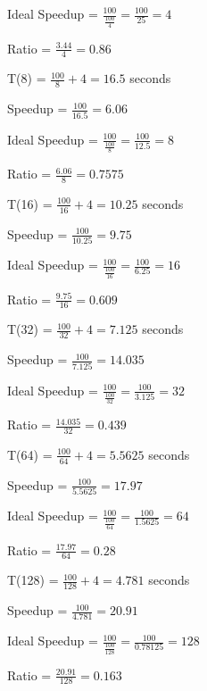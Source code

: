 \documentclass{article}
\begin{document}
    Ideal Speedup = $\frac{100}{\frac{100}{4}} = \frac{100}{25} = 4$

    Ratio = $\frac{3.44}{4} = 0.86$
    \vspace*{6pt}

    T(8) = $\frac{100}{8} + 4 = 16.5$ seconds

    Speedup = $\frac{100}{16.5} = 6.06$ 

    Ideal Speedup = $\frac{100}{\frac{100}{8}} = \frac{100}{12.5} = 8$

    Ratio = $\frac{6.06}{8} = 0.7575$
    \vspace*{6pt}

    T(16) = $\frac{100}{16} + 4 = 10.25$ seconds

    Speedup = $\frac{100}{10.25} = 9.75$ 

    Ideal Speedup = $\frac{100}{\frac{100}{16}} = \frac{100}{6.25} = 16$

    Ratio = $\frac{9.75}{16} = 0.609$
    \vspace*{6pt}

    T(32) = $\frac{100}{32} + 4 = 7.125$ seconds

    Speedup = $\frac{100}{7.125} = 14.035$ 

    Ideal Speedup = $\frac{100}{\frac{100}{32}} = \frac{100}{3.125} = 32$

    Ratio = $\frac{14.035}{32} = 0.439$
    \vspace*{6pt}

    T(64) = $\frac{100}{64} + 4 = 5.5625$ seconds

    Speedup = $\frac{100}{5.5625} = 17.97$ 

    Ideal Speedup = $\frac{100}{\frac{100}{64}} = \frac{100}{1.5625} = 64$

    Ratio = $\frac{17.97}{64} = 0.28$
    \vspace*{6pt}

    T(128) = $\frac{100}{128} + 4 = 4.781$ seconds

    Speedup = $\frac{100}{4.781} = 20.91$ 

    Ideal Speedup = $\frac{100}{\frac{100}{128}} = \frac{100}{0.78125} = 128$

    Ratio = $\frac{20.91}{128} = 0.163$
    \vspace*{6pt}

    


    

    
\end{document}
